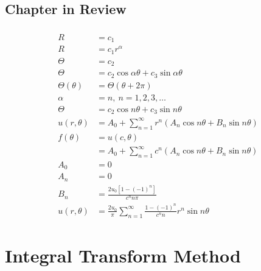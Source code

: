 \documentclass{article}
\begin{document}
\subsection{Chapter in Review}

\subsubsection{}

\begin{align*}
  R              & = c_1                                                                              \\
  R              & = c_1 r^\alpha                                                                     \\
  \Theta         & = c_2                                                                              \\
  \Theta         & = c_2 \cos \alpha \theta + c_3 \sin \alpha \theta                                  \\
  \Theta(\theta) & = \Theta(\theta + 2 \pi)                                                           \\
  \alpha         & = n,\ n = 1, 2, 3, \ldots                                                          \\
  \Theta         & = c_2 \cos n \theta + c_3 \sin n \theta                                            \\
  u(r, \theta)   & = A_0 + \sum_{n = 1}^\infty r^n (A_n \cos n \theta + B_n \sin n \theta)            \\
  f(\theta)      & = u(c, \theta)                                                                     \\
                 & = A_0 + \sum_{n = 1}^\infty c^n (A_n \cos n \theta + B_n \sin n \theta)            \\
  A_0            & = 0                                                                                \\
  A_n            & = 0                                                                                \\
  B_n            & = \frac{2 u_0 [1 - (-1)^n]}{c^n n \pi}                                             \\
  u(r, \theta)   & = \frac{2 u_0}{\pi} \sum_{n = 1}^\infty \frac{1 - (-1)^n}{c^n n} r^n \sin n \theta
\end{align*}

\section{Integral Transform Method}
\end{document}
